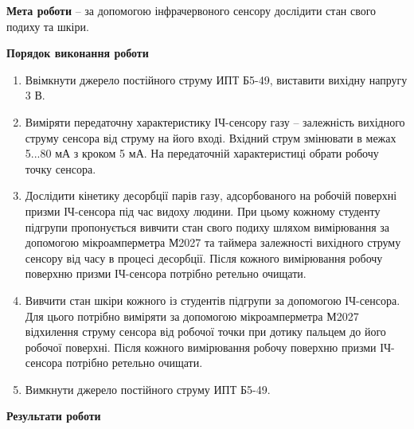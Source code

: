 \documentclass[a4paper,14pt]{extreport}
\begin{document}
\newpage
\setcounter{page}{2}
\textbf{Мета роботи} – за допомогою інфрачервоного сенсору дослідити стан свого подиху та шкіри.


\begin{center}
\textbf{Порядок виконання роботи}
\end{center}
\begin{enumerate}
  \item Ввімкнути джерело постійного струму ИПТ Б5-49, виставити вихідну
  напругу 3 В.
  \item  Виміряти передаточну характеристику ІЧ-сенсору газу – залежність
  вихідного струму сенсора від струму на його вході. Вхідний струм
  змінювати в межах 5...80 мА з кроком 5 мА. На передаточній
  характеристиці обрати робочу точку сенсора.
  \item  Дослідити кінетику десорбції парів газу, адсорбованого на робочій поверхні
  призми ІЧ-сенсора під час видоху людини. При цьому кожному студенту
  підгрупи пропонується вивчити стан свого подиху шляхом вимірювання за
  допомогою мікроамперметра М2027 та таймера залежності вихідного струму сенсору від часу в процесі десорбції. Після кожного вимірювання
  робочу поверхню призми ІЧ-сенсора потрібно ретельно очищати.
  \item Вивчити стан шкіри кожного із студентів підгрупи за допомогою ІЧ-сенсора. Для цього потрібно виміряти за допомогою мікроамперметра М2027 відхилення струму сенсора від робочої точки при дотику пальцем до його робочої поверхні. Після кожного вимірювання робочу поверхню призми ІЧ-сенсора потрібно ретельно очищати.
  \item  Вимкнути джерело постійного струму ИПТ Б5-49.
\end{enumerate}

\clearpage
\newpage

\begin{center}
\textbf{Результати роботи}
\end{center}
\end{document}
